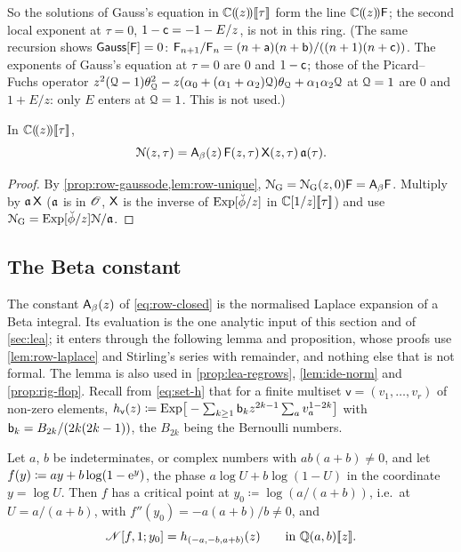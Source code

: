 So the solutions of Gauss's equation in $\mathbb{C}(\!(z)\!)[\![ \tau ]\!]$ form the line $\mathbb{C}(\!(z)\!)\mathsf{F}$; the second local exponent at $\tau=0$, $1-\mathsf{c}=-1-E/z$, is not in this ring. (The same recursion shows $\mathsf{Gauss}[\mathsf{F}]=0$: $\mathsf{F}_{n+1}/\mathsf{F}_n=(n+\mathsf{a})(n+\mathsf{b})/((n+1)(n+\mathsf{c}))$. The exponents of Gauss's equation at $\tau=0$ are $0$ and $1-\mathsf{c}$; those of the Picard--Fuchs operator $z^2(\mathcal{Q}-1)\theta_{\mathcal{Q}}^2-z(\alpha_0+(\alpha_1+\alpha_2)\mathcal{Q})\theta_{\mathcal{Q}}+\alpha_1\alpha_2\mathcal{Q}$ at $\mathcal{Q}=1$ are $0$ and $1+E/z$: only $E$ enters at $\mathcal{Q}=1$. This is not used.)

\begin{thm}
\label{thm:row-closed}
In $\mathbb{C}(\!(z)\!)[\![ \tau ]\!]$,
\begin{equation}
\label{eq:row-closed}
\mathcal{N}(z,\tau)=\mathsf{A}_{\beta}(z)\,\mathsf{F}(z,\tau)\,\mathsf{X}(z,\tau)\,\mathfrak{a}(\tau).
\end{equation}
\end{thm}

\begin{proof}
By \cref{prop:row-gaussode,lem:row-unique}, $\mathcal{N}_{\mathrm{G}}=\mathcal{N}_{\mathrm{G}}(z,0)\mathsf{F}=\mathsf{A}_{\beta}\mathsf{F}$. Multiply by $\mathfrak{a}\,\mathsf{X}$ ($\mathfrak{a}$ is in $\mathscr{O}$, $\mathsf{X}$ is the inverse of $\mathrm{Exp}[\breve{\phi}/z]$ in $\mathbb{C}[1/z][\![ \tau ]\!]$) and use $\mathcal{N}_{\mathrm{G}}=\mathrm{Exp}[\breve{\phi}/z]\mathcal{N}/\mathfrak{a}$.
\end{proof}

\subsection{The Beta constant}
\label{sec:row-beta}

The constant $\mathsf{A}_{\beta}(z)$ of \eqref{eq:row-closed} is the normalised Laplace expansion of a Beta integral. Its evaluation is the one analytic input of this section and of \cref{sec:lea}; it enters through the following lemma and proposition, whose proofs use \cref{lem:row-laplace} and Stirling's series with remainder, and nothing else that is not formal. The lemma is also used in \cref{prop:lea-regrows}, \cref{lem:ide-norm} and \cref{prop:rig-flop}. Recall from \eqref{eq:set-h} that for a finite multiset $\mathsf{v}=(v_1,\dots,v_r)$ of non-zero elements, $h_{\mathsf{v}}(z)\coloneqq\mathrm{Exp}\big[-\sum_{k\geq1}\mathsf{b}_kz^{2k-1}\sum_av_a^{1-2k}\big]$ with $\mathsf{b}_k=B_{2k}/(2k(2k-1))$, the $B_{2k}$ being the Bernoulli numbers.

\begin{lem}
\label{lem:row-betaphase}
Let $a$, $b$ be indeterminates, or complex numbers with $ab(a+b)\neq0$, and let $f(y)\coloneqq ay+b\log(1-\mathrm{e}^y)$, the phase $a\log U+b\log(1-U)$ in the coordinate $y=\log U$. Then $f$ has a critical point at $y_0\coloneqq\log(a/(a+b))$, i.e.\ at $U=a/(a+b)$, with $f''(y_0)=-a(a+b)/b\neq0$, and
\begin{equation}
\label{eq:row-betaphase}
\mathscr{N}[f,1;y_0]=h_{(-a,-b,a+b)}(z)\qquad\text{in }\mathbb{Q}(a,b)[\![ z ]\!].
\end{equation}
\end{lem}

